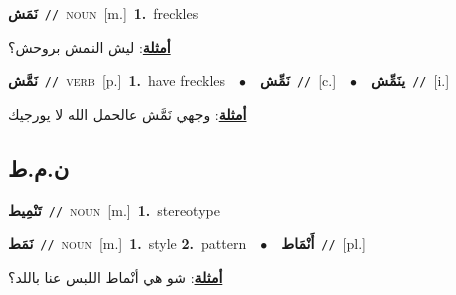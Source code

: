 \documentclass[10pt,a4paper,twoside]{article} %
\begin{document}
\begin{multicols}{2}
{\setlength\topsep{0pt}\textbf{\foreignlanguage{arabic}{نَمَش}}\ {\color{gray}\texttt{//}\color{black}}\ \textsc{noun}\ [m.]\ \textbf{1.}~freckles\  \begin{flushright}\color{gray}\foreignlanguage{arabic}{\textbf{\underline{\foreignlanguage{arabic}{أمثلة}}}: ليش النمش بروحش؟}\end{flushright}\color{black}} \vspace{2mm}

{\setlength\topsep{0pt}\textbf{\foreignlanguage{arabic}{نَمَّش}}\ {\color{gray}\texttt{//}\color{black}}\ \textsc{verb}\ [p.]\ \textbf{1.}~have freckles\ \ $\bullet$\ \ \setlength\topsep{0pt}\textbf{\foreignlanguage{arabic}{نَمِّش}}\ {\color{gray}\texttt{//}\color{black}}\ [c.]\ \ $\bullet$\ \ \setlength\topsep{0pt}\textbf{\foreignlanguage{arabic}{ينَمِّش}}\ {\color{gray}\texttt{//}\color{black}}\ [i.]\  \begin{flushright}\color{gray}\foreignlanguage{arabic}{\textbf{\underline{\foreignlanguage{arabic}{أمثلة}}}: وجهي نَمَّش عالحمل الله لا يورجيك}\end{flushright}\color{black}} \vspace{2mm}

\vspace{-3mm}
\subsection*{\color{blue}\foreignlanguage{arabic}{ن.م.ط}\color{blue}{}} 

{\setlength\topsep{0pt}\textbf{\foreignlanguage{arabic}{تَنْمِيط}}\ {\color{gray}\texttt{//}\color{black}}\ \textsc{noun}\ [m.]\ \textbf{1.}~stereotype\ } \vspace{2mm}

{\setlength\topsep{0pt}\textbf{\foreignlanguage{arabic}{نَمَط}}\ {\color{gray}\texttt{//}\color{black}}\ \textsc{noun}\ [m.]\ \textbf{1.}~style  \textbf{2.}~pattern\ \ $\bullet$\ \ \setlength\topsep{0pt}\textbf{\foreignlanguage{arabic}{أَنْمَاط}}\ {\color{gray}\texttt{//}\color{black}}\ [pl.]\  \begin{flushright}\color{gray}\foreignlanguage{arabic}{\textbf{\underline{\foreignlanguage{arabic}{أمثلة}}}: شو هي أنْماط اللبس عنا باللد؟}\end{flushright}\color{black}} \vspace{2mm}


\end{multicols}
\end{document}
